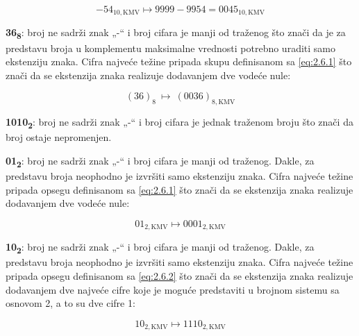 \documentclass[a4paper,11pt]{article}
\numberwithin{equation}{section}
\begin{document}
\begin{equation}\label{eq:2.6.7}
- 54_{10,\mathrm{KMV}} \longmapsto 9999 - 9954 = 0045_{10,\mathrm{KMV}}
\end{equation}


\textbf{36\textsubscript{8}}: broj ne sadrži znak „-“ i broj cifara je manji od traženog što znači da je za predstavu broja u komplementu maksimalne vrednosti potrebno uraditi samo ekstenziju znaka. Cifra najveće težine pripada skupu definisanom sa \eqref{eq:2.6.1} što znači da se ekstenzija znaka realizuje dodavanjem dve vodeće nule:



\begin{equation}\label{eq:2.6.8}
(36)_8\ \longmapsto\ (0036)_{8,\mathrm{KMV}}
\end{equation}


\textbf{1010\textsubscript{2}}: broj ne sadrži znak „-“ i broj cifara je jednak traženom broju što znači da broj ostaje nepromenjen.



\textbf{01\textsubscript{2}}: broj ne sadrži znak „-“ i broj cifara je manji od traženog. Dakle, za predstavu broja neophodno je izvršiti samo ekstenziju znaka. Cifra najveće težine pripada opsegu definisanom sa \eqref{eq:2.6.1} što znači da se ekstenzija znaka realizuje dodavanjem dve vodeće nule:



\begin{equation}\label{eq:2.6.9}
01_{2,\mathrm{KMV}} \longmapsto 0001_{2,\mathrm{KMV}}
\end{equation}


\textbf{10\textsubscript{2}}: broj ne sadrži znak „-“ i broj cifara je manji od traženog. Dakle, za predstavu broja neophodno je izvršiti samo ekstenziju znaka. Cifra najveće težine pripada opsegu definisanom sa \eqref{eq:2.6.2} što znači da se ekstenzija znaka realizuje dodavanjem dve najveće cifre koje je moguće predstaviti u brojnom sistemu sa osnovom 2, a to su dve cifre 1:



\begin{equation}\label{eq:2.6.10}
10_{2,\mathrm{KMV}} \longmapsto 1110_{2,\mathrm{KMV}}
\end{equation}


\FloatBarrier
\end{document}
